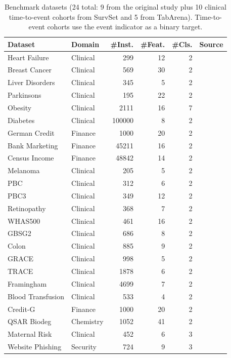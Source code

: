 \begin{table}[t]\centering\small
\setlength{\tabcolsep}{5pt}\renewcommand{\arraystretch}{1.05}
\caption{Benchmark datasets (24 total: 9 from the original study plus 10 clinical time-to-event cohorts from SurvSet and 5 from TabArena). Time-to-event cohorts use the event indicator as a binary target.}
\label{tab:datasets}
\begin{tabular}{@{}llrrrl@{}}\toprule
\textbf{Dataset} & \textbf{Domain} & \textbf{\#Inst.} & \textbf{\#Feat.} & \textbf{\#Cls.} & \textbf{Source} \\ \midrule
Heart Failure & Clinical & 299 & 12 & 2 & \cite{chicco2020ml} \\
Breast Cancer & Clinical & 569 & 30 & 2 & \cite{uci} \\
Liver Disorders & Clinical & 345 & 5 & 2 & \cite{uci} \\
Parkinsons & Clinical & 195 & 22 & 2 & \cite{little2007exploiting} \\
Obesity & Clinical & 2111 & 16 & 7 & \cite{palechor2019dataset} \\
Diabetes & Clinical & 100000 & 8 & 2 & \cite{kaggle_diabetes} \\
German Credit & Finance & 1000 & 20 & 2 & \cite{uci} \\
Bank Marketing & Finance & 45211 & 16 & 2 & \cite{moro2014data} \\
Census Income & Finance & 48842 & 14 & 2 & \cite{kohavi1996scaling} \\
Melanoma & Clinical & 205 & 5 & 2 & \cite{drysdale2022survset} \\
PBC & Clinical & 312 & 6 & 2 & \cite{drysdale2022survset} \\
PBC3 & Clinical & 349 & 12 & 2 & \cite{drysdale2022survset} \\
Retinopathy & Clinical & 368 & 7 & 2 & \cite{drysdale2022survset} \\
WHAS500 & Clinical & 461 & 16 & 2 & \cite{drysdale2022survset} \\
GBSG2 & Clinical & 686 & 8 & 2 & \cite{drysdale2022survset} \\
Colon & Clinical & 885 & 9 & 2 & \cite{drysdale2022survset} \\
GRACE & Clinical & 998 & 5 & 2 & \cite{drysdale2022survset} \\
TRACE & Clinical & 1878 & 6 & 2 & \cite{drysdale2022survset} \\
Framingham & Clinical & 4699 & 7 & 2 & \cite{drysdale2022survset} \\
Blood Transfusion & Clinical & 533 & 4 & 2 & \cite{erickson2025tabarena} \\
Credit-G & Finance & 1000 & 20 & 2 & \cite{erickson2025tabarena} \\
QSAR Biodeg & Chemistry & 1052 & 41 & 2 & \cite{erickson2025tabarena} \\
Maternal Risk & Clinical & 452 & 6 & 3 & \cite{erickson2025tabarena} \\
Website Phishing & Security & 724 & 9 & 3 & \cite{erickson2025tabarena} \\
\bottomrule\end{tabular}\end{table}

